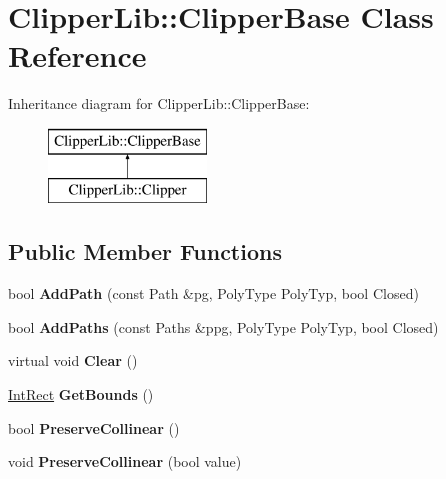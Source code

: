 \hypertarget{class_clipper_lib_1_1_clipper_base}{}\section{Clipper\+Lib\+:\+:Clipper\+Base Class Reference}
\label{class_clipper_lib_1_1_clipper_base}
Inheritance diagram for Clipper\+Lib\+:\+:Clipper\+Base\+:\begin{figure}[H]
\begin{center}
\leavevmode
\includegraphics[height=2.000000cm]{class_clipper_lib_1_1_clipper_base}
\end{center}
\end{figure}
\subsection*{Public Member Functions}
\begin{DoxyCompactItemize}
\item 
\mbox{\label{class_clipper_lib_1_1_clipper_base_a7545ac6e146894dc8416887eadd01dba}} 
bool {\bfseries Add\+Path} (const Path \&pg, Poly\+Type Poly\+Typ, bool Closed)
\item 
\mbox{\label{class_clipper_lib_1_1_clipper_base_a2395967b47fb9f3f5846e2bf56c18f67}} 
bool {\bfseries Add\+Paths} (const Paths \&ppg, Poly\+Type Poly\+Typ, bool Closed)
\item 
\mbox{\label{class_clipper_lib_1_1_clipper_base_a5690952fe8c2cb047025566405827821}} 
virtual void {\bfseries Clear} ()
\item 
\mbox{\label{class_clipper_lib_1_1_clipper_base_a5590a5454248ac3f6beeba7f9690f62e}} 
\mbox{\hyperlink{struct_clipper_lib_1_1_int_rect}{Int\+Rect}} {\bfseries Get\+Bounds} ()
\item 
\mbox{\label{class_clipper_lib_1_1_clipper_base_a95c47199aeb139b13059968bc6056f44}} 
bool {\bfseries Preserve\+Collinear} ()
\item 
\mbox{\label{class_clipper_lib_1_1_clipper_base_aa827cfffd9be40dba7d503a3da708b91}} 
void {\bfseries Preserve\+Collinear} (bool value)
\end{DoxyCompactItemize}

